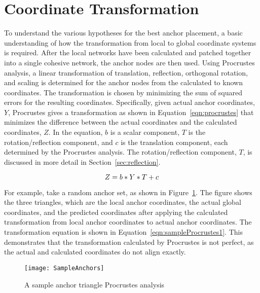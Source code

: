 \section{Coordinate Transformation} \label{sec:procrustes}
To understand the various hypotheses for the best anchor placement, a basic understanding of how the transformation from local to global coordinate systems is required.  After the local networks have been calculated and patched together into a single cohesive network, the anchor nodes are then used. Using Procrustes~\cite{procrustes-matlab} analysis, a linear transformation of translation, reflection, orthogonal rotation, and scaling is determined for the anchor nodes from the calculated to known coordinates. The transformation is chosen by minimizing the sum of squared errors for the resulting coordinates.  Specifically, given actual anchor coordinates, $Y$, Procrustes gives a transformation as shown in Equation~\ref{eqn:procrustes} that minimizes the difference between the actual coordinates and the calculated coordinates, $Z$.  In the equation, $b$ is a scalar component, $T$ is the rotation/reflection component, and $c$ is the translation component, each determined by the Procrustes analysis.  The rotation/reflection component, $T$, is discussed in more detail in Section~\ref{sec:reflection}.

\begin{equation}\label{eqn:procrustes}
Z = b*Y*T + c \\
\end{equation}

For example, take a random anchor set, as shown in Figure~\ref{fig:sampleProcrustes1}.  The figure shows the three triangles, which are the local anchor coordinates, the actual global coordinates, and the predicted coordinates after applying the calculated transformation from local anchor coordinates to actual anchor coordinates.  The transformation equation is shown in Equation~\ref{eqn:sampleProcrustes1}.  This demonstrates that the transformation calculated by Procrustes is not perfect, as the actual and calculated coordinates do not align exactly.

\begin{figure}
	\centering
		\texttt{[image: SampleAnchors]}
	\caption{A sample anchor triangle Procrustes analysis}
	\label{fig:sampleProcrustes1}
\end{figure}

